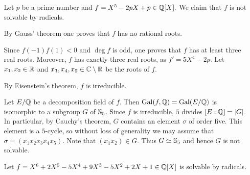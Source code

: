 \begin{example}
    Let $p$ be a prime number and $f=X^5-2pX+p\in\mathbb{Q}[X]$. 
    We claim that 
    $f$ is not solvable by radicals. 
    
    By Gauss' theorem 
    one proves that $f$ has no rational roots. 
    
    Since $f(-1)f(1)<0$ and 
    $\deg f$ is odd, one proves that $f$ 
    has at least three real roots. Moreover, 
    $f$ has exactly three real roots, as $f'=5X^4-2p$. Let 
    $x_1,x_2\in\mathbb{R}$ and $x_3,x_4,x_5\in\mathbb{C}\setminus\mathbb{R}$ be the roots
    of $f$. 
    
    By Eisenstein's theorem, $f$ is irreducible. 
    
    Let $E/\mathbb{Q}$ be a decomposition field of $f$. 
    Then $\operatorname{Gal}(f,\mathbb{Q})=\operatorname{Gal}(E/\mathbb{Q})$ is isomorphic to a subgroup $G$ of $\mathbb{S}_5$.
    Since 
    $f$ is irreducible, $5$ divides $[E:\mathbb{Q}]=|G|$. In particular, 
    by Cauchy's theorem, $G$ contains an element $\sigma$ of order five. This element
    is a $5$-cycle, so without loss of generality we may assume that 
    $\sigma=(x_1x_2x_3x_4x_5)$. Note that 
    $(x_1x_2)\in G$. Thus $G\simeq\mathbb{S}_5$ and hence
    $G$ is not solvable. 
\end{example}

\begin{exercise}
    Let $f=X^6+2X^5-5X^4+9X^3-5X^2+2X+1\in\mathbb{Q}[X]$ is solvable by radicals. 
\end{exercise}


